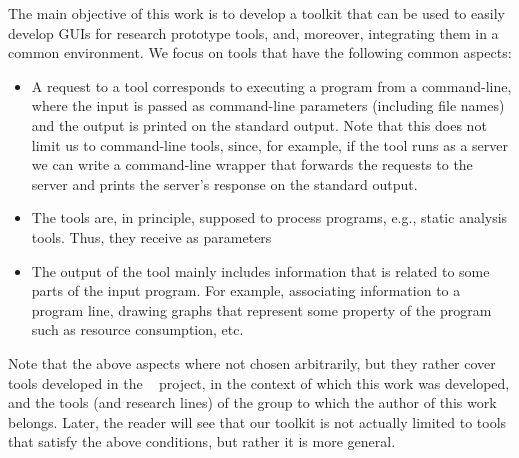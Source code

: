 The main objective of this work is to develop a toolkit that can be
used to easily develop GUIs for research prototype tools, and,
moreover, integrating them in a common environment. We focus on tools
that have the following common aspects:
%
\begin{itemize}
%
\item A request to a tool corresponds to executing a program from a
  command-line, where the input is passed as command-line parameters
  (including file names) and the output is printed on the standard
  output. Note that this does not limit us to command-line tools,
  since, for example, if the tool runs as a server we can write a
  command-line wrapper that forwards the requests to the server and
  prints the server's response on the standard output.
%
\item The tools are, in principle, supposed to process programs, e.g.,
  static analysis tools. Thus, they receive as parameters
%
\item The output of the tool mainly includes information that is
  related to some parts of the input program. For example, associating
  information to a program line, drawing graphs that represent some
  property of the program such as resource consumption, etc.
\end{itemize}
%
Note that the above aspects where not chosen arbitrarily, but they
rather cover tools developed in the \envisage~\cite{envisage} project,
in the context of which this work was developed, and the tools (and
research lines) of the \costa group to which the author of this work
belongs. Later, the reader will see that our toolkit is not actually
limited to tools that satisfy the above conditions, but rather it is
more general.


